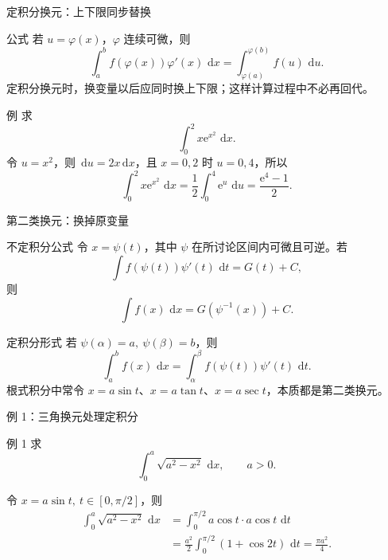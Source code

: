 \documentclass[aspectratio=169,10pt]{ctexbeamer}
\newcommand{\dd}{\,\mathrm{d}}
\newcommand{\ee}{\mathrm{e}}
\begin{document}
\begin{frame}[t]{定积分换元：上下限同步替换}
\small
\begin{block}{公式}
若 $u=\varphi(x)$，$\varphi$ 连续可微，则
\[
  \int_a^b f(\varphi(x))\varphi'(x)\,\dd x
  =\int_{\varphi(a)}^{\varphi(b)} f(u)\,\dd u.
\]
定积分换元时，换变量以后应同时换上下限；这样计算过程中不必再回代。
\end{block}

\begin{block}{例}
求
\[
  \int_0^2 x\ee^{x^2}\,\dd x.
\]
令 $u=x^2$，则 $\dd u=2x\dd x$，且 $x=0,2$ 时 $u=0,4$，所以
\[
  \int_0^2 x\ee^{x^2}\,\dd x
  =\frac12\int_0^4\ee^u\,\dd u
  =\frac{\ee^4-1}{2}.
\]
\end{block}
\end{frame}

\begin{frame}[t]{第二类换元：换掉原变量}
\small
\begin{block}{不定积分公式}
令 $x=\psi(t)$，其中 $\psi$ 在所讨论区间内可微且可逆。若
\[
  \int f(\psi(t))\psi'(t)\,\dd t=G(t)+C,
\]
则
\[
  \int f(x)\,\dd x=G(\psi^{-1}(x))+C.
\]
\end{block}

\begin{block}{定积分形式}
若 $\psi(\alpha)=a,\ \psi(\beta)=b$，则
\[
  \int_a^b f(x)\,\dd x
  =\int_\alpha^\beta f(\psi(t))\psi'(t)\,\dd t.
\]
根式积分中常令 $x=a\sin t$、$x=a\tan t$、$x=a\sec t$，本质都是第二类换元。
\end{block}
\end{frame}

\begin{frame}[t]{例 1：三角换元处理定积分}
\small
\begin{block}{例 1}
求
\[
  \int_0^a \sqrt{a^2-x^2}\,\dd x,\qquad a>0.
\]
\end{block}

令 $x=a\sin t,\ t\in[0,\pi/2]$，则
\[
\begin{aligned}
\int_0^a \sqrt{a^2-x^2}\,\dd x
&=\int_0^{\pi/2} a\cos t\cdot a\cos t\,\dd t  \\
&=\frac{a^2}{2}\int_0^{\pi/2}(1+\cos 2t)\,\dd t
=\frac{\pi a^2}{4}.
\end{aligned}
\]
\end{frame}
\end{document}
